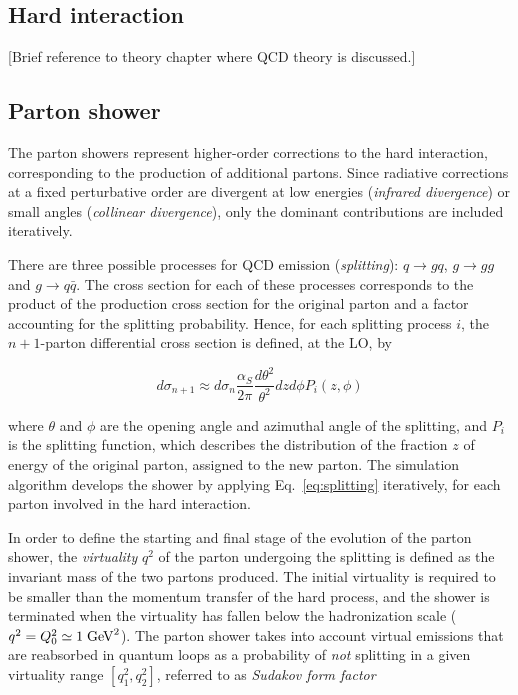 \subsection{Hard interaction}
\label{sec:hardinteraction}

[Brief reference to theory chapter where QCD theory is discussed.]

\subsection{Parton shower}
\label{sec:partonshower}

The parton showers represent higher-order corrections to the hard
interaction, corresponding to the production of additional partons.
Since radiative corrections at a fixed perturbative order are
divergent at low energies ({\it infrared divergence}) or small angles
({\it collinear divergence}), only the dominant contributions are
included iteratively.

There are three possible processes for QCD emission ({\it splitting}): 
$q\to gq$, $g\to gg$ and $g\to q\bar{q}$.
The cross section for each of these processes corresponds to the
product of the production cross section for the original parton and a
factor accounting for the splitting probability. Hence, for each
splitting process $i$, the $n+1$-parton differential cross section is
defined, at the LO, by

\begin{equation}
  d\sigma_{n+1}\approx{} d\sigma_{n}
  \frac{\alpha_S}{2\pi}\frac{d\theta^2}{\theta^2} dz d\phi P_i(z,\phi) 
 \label{eq:splitting}
\end{equation}

where $\theta$ and $\phi$ are the opening angle and azimuthal angle of
the splitting, and $P_i$ is the splitting function, which describes
the distribution of the fraction $z$ of energy of the original parton,
assigned to the new parton.
The simulation algorithm develops the shower by applying
Eq.~\ref{eq:splitting} iteratively, for each parton involved in the
hard interaction.

In order to define the starting and final stage of the evolution of
the parton shower, the {\it virtuality} $q^2$ of the parton undergoing
the splitting is defined as the invariant mass of the two partons
produced. The initial virtuality is required to be smaller than the
momentum transfer of the hard process, and the shower is terminated
when the virtuality has fallen below the hadronization scale
($q^2=Q_0^2\simeq1\; \mathrm{GeV}^2$).
The parton shower takes into account virtual emissions that are
reabsorbed in quantum loops as a probability of {\it not} splitting in
a given virtuality range $[q_1^2,q_2^2]$, referred to as {\it Sudakov form factor}

